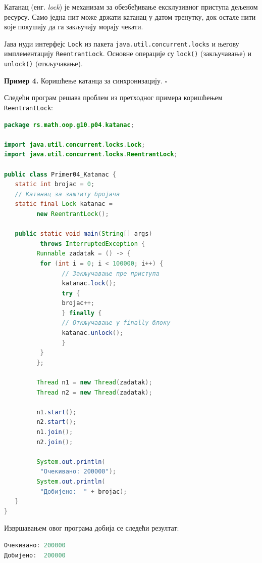 Катанац (енг. \textit{lock}) је механизам за обезбеђивање ексклузивног приступа дељеном ресурсу. Само једна нит може држати катанац у датом тренутку, док остале нити које покушају да га закључају морају чекати.

Јава нуди интерфејс \texttt{Lock} из пакета \texttt{java.util.concurrent.locks} и његову имплементацију \texttt{ReentrantLock}. Основне операције су \texttt{lock()} (закључавање) и \texttt{unlock()} (откључавање).


\bigskip

\noindent \textbf{Пример 4.} Коришћење катанца за синхронизацију. $\square$

\medskip

Следећи програм решава проблем из претходног примера коришћењем \texttt{ReentrantLock}:


\begin{lstlisting}[language=Java]
package rs.math.oop.g10.p04.katanac;
 
import java.util.concurrent.locks.Lock;
import java.util.concurrent.locks.ReentrantLock;
 
public class Primer04_Katanac {
   static int brojac = 0;
   // Катанац за заштиту бројача
   static final Lock katanac =
         new ReentrantLock();
 
   public static void main(String[] args)
          throws InterruptedException {
         Runnable zadatak = () -> {
          for (int i = 0; i < 100000; i++) {
                // Закључавање пре приступа
                katanac.lock();
                try {
                brojac++;
                } finally {
                // Откључавање у finally блоку
                katanac.unlock();
                }
          }
         };
 
         Thread n1 = new Thread(zadatak);
         Thread n2 = new Thread(zadatak);
 
         n1.start();
         n2.start();
         n1.join();
         n2.join();
 
         System.out.println(
          "Очекивано: 200000");
         System.out.println(
          "Добијено:  " + brojac);
   }
}
\end{lstlisting}


Извршавањем овог програма добија се следећи резултат:


\begin{lstlisting}[language=Java]
Очекивано: 200000
Добијено:  200000
\end{lstlisting}



